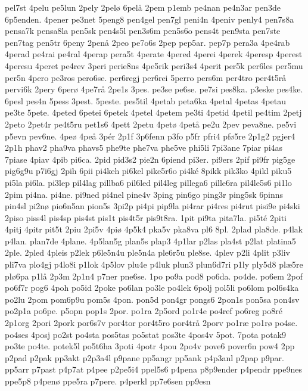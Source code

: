 pel7st
4pelu
pe5lun
2pely
2pel^^f8
6pel^^e5
2pem
p1emb
pe4nan
pe4n3ar
pen3de
6p5enden.
4pener
pe3net
5peng8
pen4gel
pen7gl
peni4n
4peniv
penly4
pen7s8a
pensa7k
pensa8la
pen5sk
pen4s5l
pen3s6m
pen5s6o
pens4t
pen9sta
pen7ste
pen7tag
pen5tr
6peny
2pen^^e5
2peo
pe7o6s
2pep
pep5ar.
pep7p
pera3a
4pe4rab
4perad
pe4rai
pe4ral
4perap
pera5t
4perate
4pered
4perei
4perek
4peresp
4perest
4peresu
4peret
pe4rev
3peri
perie8ns
4pe5rik
peri3s4
4perit
per5k
per6les
per5mu
per5n
4pero
pe3ros
pero6se.
per6regj
per6rei
5perro
pers6m
per4tro
per4t5r^^e5
pervi6k
2pery
6per^^f8
4pe7r^^e5
2pe1s
3pes.
pe3se
pe6se.
pe7si
pes8ka.
p3eske
pes4ke.
6pesl
pes4n
5pess
3pest.
5peste.
pes5til
4petab
peta6ka
4petal
4petas
4petau
pe3te
5pete.
4peted
6petei
6petek
4petel
4petem
pe3ti
4petid
4petil
pe4tim
2petj
2peto
2pet4r
pe4t5ru
pet1s6
4pett
2petu
4pet^^f8
4pet^^e5
pe2u
2pev
peva8ne.
pe5vi
p5evn
pev6ne.
4pe^^f8
4pe^^e5
3p^^e9r
2p1f
3p6fenn
p3fo
p5fr
pfri4
pf^^f85re
2p1g2
pgjer4
2p1h
phav2
pha9va
phavs5
phe9te
phe7va
phe5ve
phi5li
7pi3ane
7piar
pi4as
7piase
4piav
4pib
pi6ca.
2pid
pid3s2
pie2n
6piend
pi3er.
pi9ers
2pif
pi9fr
pig5ge
pig6g9u
p7i6gj
2pih
6pii
pi4keh
pi6kel
pike5r6o
pi4k^^e9
8pikk
pik3ko
4pikl
piku5
pi5la
pi6la.
pi3lep
pil4lag
pillba6
pil6led
pil4leg
pillega6
pille6ra
pil4le5s6
pi1lo
2pim
pi4na.
pi4ne.
pi9ned
pi4nel
pine4v
3ping
pin6go
ping3r
ping5sk
6pinns
pin4sl
pi2n^^f8
pio6n5an
pion5s
3pi2p
pi4pi
pip9la
pi4rar
pi4res
pi4rut
pisi9e
pi4ski
2piso
piss4l
pis4sp
pis4st
pis1t
pis4t5r
pis9t8ra.
1pit
pi9ta
pita7la.
pi5t^^e9
2piti
4pitj
4pitr
pit5t
2piu
2pi5v
4pi^^f8
4p5k4
pka5v
pka8va
pl6
8pl.
2plad
pla8de.
p4lak
p4lan.
plan7de
4plane.
4p5lan5g
plan5s
plap3
4p1lar
p2las
pla4st
p2lat
platina5
2ple.
2pled
4pleis
p2lek
p6le5n4u
ple5n4a
ple6r5u
ple8se.
4plev
p2li
4plit
p3liv
pli7va
plo4gj
p4lo8i
p1lok
4p5lov
plu4e
p4luk
plun3
plun6d7ri
p1ly
ply5d8
pl^^e65re
pl^^f86pa
p1l^^e5
2p3m
2p1n4
p7ner
pne6se.
1po
po9a
pod8
po6da.
po4de.
po6em
2pof
po6f7r
pog6
4poh
po5id
2poke
po6lan
po3le
po4lek
6polj
pol5li
po6lom
pol6s4ka
po2lu
2pom
pom6p9u
pom5s
4pon.
pon5d
pon4gr
pongs6
2pon1s
pon5sa
pon4sv
po2p1a
po6pe.
p5opn
pop1s
2por.
po1ra
2p5ord
po1r4e
po4ref
po6reg
po8r^^e9
2p1org
2pori
2pork
por6s7v
por4tor
por4t5ro
por4tr^^e5
2porv
po1r^^e6
po1r^^f8
po4se.
po4ses
4posj
po2st
po4sta
pos5tas
po5stat
pos3te
4pos4v
5pot.
7pota
potak9
po3te
po4te.
potek5l
po5t6ha
3poti
4potr
4pou
2po4v
pove6
pover6n
pow4
2pp
p2pad
p2pak
pp3akt
p2p3a4l
p9pane
pp5angr
pp5ank
p4p3anl
p2pap
p9par.
pp5arr
p7past
p4p7at
p4pee
p2pe5i4
ppel5s6
p4pena
p8p9ender
p4pendr
ppe9nes
ppe5p8
p4pen^^f8
ppe5ra
p7pere.
p4perkl
pp7e6sen
pp9esn
